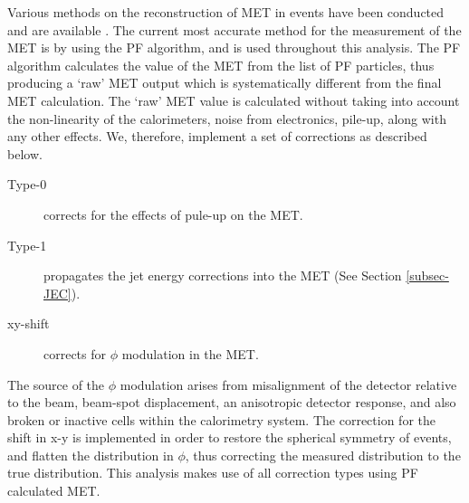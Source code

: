Various methods on the reconstruction of MET in events have been conducted and are available \cite{1748-0221-6-09-P09001}. The current most accurate method for the measurement of the MET is by using the PF algorithm, and is used throughout this analysis. The PF algorithm calculates the value of the MET from the list of PF particles, thus producing a `raw' MET output which is systematically different from the final MET calculation. The `raw' MET value is calculated without taking into account the non-linearity of the calorimeters, noise from electronics, pile-up, along with any other effects. We, therefore, implement a set of corrections as described below.

\begin{description}
	\item[Type-0] corrects for the effects of pule-up on the MET.
	\item[Type-1] propagates the jet energy corrections into the MET (See Section \ref{subsec-JEC}). 
	\item[xy-shift] corrects for $\phi$ modulation in the MET.
\end{description}

The source of the $\phi$ modulation arises from misalignment of the detector relative to the beam, beam-spot displacement, an anisotropic detector response, and also broken or inactive cells within the calorimetry system. The correction for the shift in x-y is implemented in order to restore the spherical symmetry of events, and flatten the distribution in $\phi$, thus correcting the measured distribution to the true distribution. This analysis makes use of all correction types using PF calculated MET. 